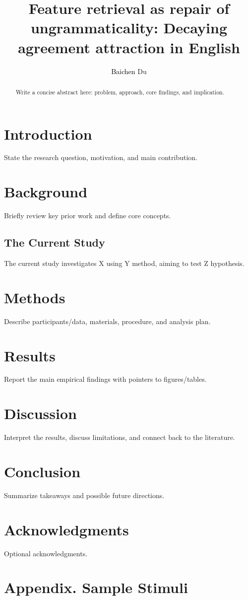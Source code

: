 \documentclass[a4paper,fleqn]{baichen_termpapers}
\begin{document}
\title[mode = title]{Feature retrieval as repair of ungrammaticality: Decaying agreement attraction in English}
\author[]{\textcolor{black}{Baichen} Du}

\begin{abstract}
Write a concise abstract here: problem, approach, core findings, and implication.
\end{abstract}

\maketitle

\section{Introduction}
State the research question, motivation, and main contribution.

\section{Background}


Briefly review key prior work and define core concepts.


\subsection{The Current Study}

The current study investigates X using Y method, aiming to test Z hypothesis.

\section{Methods}
Describe participants/data, materials, procedure, and analysis plan.

\section{Results}
Report the main empirical findings with pointers to figures/tables.

\section{Discussion}
Interpret the results, discuss limitations, and connect back to the literature.

\section{Conclusion}
Summarize takeaways and possible future directions.

\section*{Acknowledgments}
Optional acknowledgments.




\appendix
\section{Appendix. Sample Stimuli}
\end{document}
